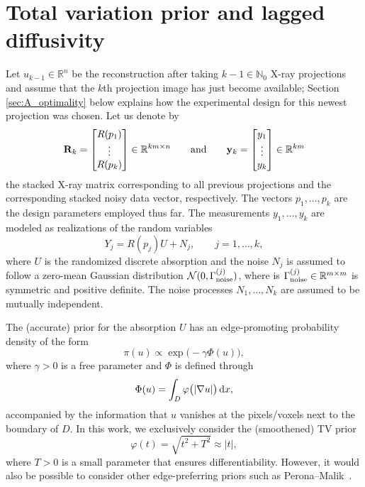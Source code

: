 \documentclass[final]{siamltex}
\newcommand{\N}{\mathbb{N}}
\newcommand{\R}{\mathbb{R}}
\begin{document}
\section{Total variation prior and lagged diffusivity}
\label{sec:lagged_diff}
Let $u_{k-1} \in \R^n$ be the reconstruction after taking $k-1 \in \N_0$ X-ray projections and assume that the $k$th projection image has just become available; Section \ref{sec:A_optimality} below explains how the experimental design for this newest projection was chosen. Let us denote by
$$
\mathbf{R}_k =
\begin{bmatrix}
  R(p_1) \\
  \vdots \\
  R(p_k)
\end{bmatrix} \in \R^{km \times n} \qquad {\rm and} \qquad
\mathbf{y}_k = \begin{bmatrix}
  y_1 \\
  \vdots \\
  y_k
\end{bmatrix} \in \R^{km}
$$
the stacked X-ray matrix corresponding to all previous projections and the corresponding stacked noisy data vector, respectively. The vectors $p_1, \dots, p_k$ are the design parameters employed thus far. The measurements $y_1, \dots, y_k$ are modeled as realizations of the random variables
\begin{equation}
  \label{eq:meas_model}
Y_j = R(p_j) U + N_j, \qquad j=1, \dots, k,
\end{equation}
where $U$ is the randomized discrete absorption and the noise $N_j$ is assumed to follow a zero-mean Gaussian distribution $\mathcal{N}(0, \Gamma_{\rm noise}^{(j)})$, where is $\Gamma_{\rm noise}^{(j)} \in \R^{m \times m}$ is symmetric and positive definite. The noise processes $N_1, \dots, N_k$ are assumed to be mutually independent.

The (accurate) prior for the absorption $U$ has an edge-promoting probability density of the form
\begin{equation}
\label{eq:sigma_prior}
\pi(u) \propto \exp \! \big( -\gamma  \Phi(u) \big),
\end{equation}
where $\gamma > 0$ is a free parameter and $\Phi$ is defined through
\begin{equation}
\label{eq:aRRa}
\Phi(u) = \int_{D} \varphi \big(|\nabla u | \big) \, {\rm d} x,
\end{equation}
accompanied by the information that $u$ vanishes at the pixels/voxels next to the boundary of $D$. In this work, we exclusively consider the (smoothened) TV prior~\cite{Rudin92}
\begin{equation}
\label{eq:arra}
\varphi(t) = \sqrt{t^2 + T^2} \approx | t |,
\end{equation}
where $T>0$ is a small parameter that ensures differentiability. However, it would also be possible to consider other edge-preferring priors such as Perona--Malik~\cite{Perona90}.
\end{document}

